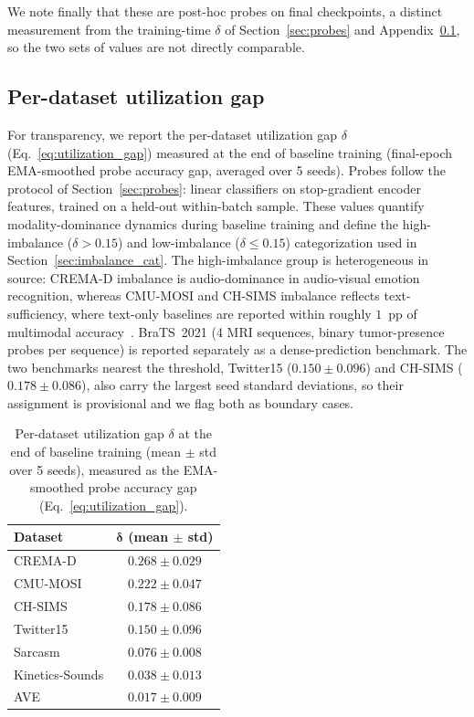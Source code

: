 \documentclass{article}
\begin{document}
We note finally that these are post-hoc probes on final checkpoints, a distinct measurement from the training-time $\delta$ of Section~\ref{sec:probes} and Appendix~\ref{app:delta}, so the two sets of values are not directly comparable.

\subsection{Per-dataset utilization gap}
\label{app:delta}

For transparency, we report the per-dataset utilization gap $\delta$ (Eq.~\eqref{eq:utilization_gap}) measured at the end of baseline training (final-epoch EMA-smoothed probe accuracy gap, averaged over 5 seeds). Probes follow the protocol of Section~\ref{sec:probes}: linear classifiers on stop-gradient encoder features, trained on a held-out within-batch sample. These values quantify modality-dominance dynamics during baseline training and define the high-imbalance ($\delta > 0.15$) and low-imbalance ($\delta \leq 0.15$) categorization used in Section~\ref{sec:imbalance_cat}. The high-imbalance group is heterogeneous in source: CREMA-D imbalance is audio-dominance in audio-visual emotion recognition, whereas CMU-MOSI and CH-SIMS imbalance reflects text-sufficiency, where text-only baselines are reported within roughly $1$~pp of multimodal accuracy~\citep{li2023agm,liu2022chsimsv2,wei2025dgl}. BraTS~2021 (4 MRI sequences, binary tumor-presence probes per sequence) is reported separately as a dense-prediction benchmark. The two benchmarks nearest the threshold, Twitter15 ($0.150 \pm 0.096$) and CH-SIMS ($0.178 \pm 0.086$), also carry the largest seed standard deviations, so their assignment is provisional and we flag both as boundary cases.

\begin{table}[H]
\centering
\caption{Per-dataset utilization gap $\delta$ at the end of baseline training (mean $\pm$ std over 5 seeds), measured as the EMA-smoothed probe accuracy gap (Eq.~\eqref{eq:utilization_gap}).}
\label{tab:delta_per_dataset}
\vspace{0.3em}
\begin{tabular}{lc}
\toprule
\textbf{Dataset} & $\boldsymbol{\delta}$ \textbf{(mean $\pm$ std)} \\
\midrule
CREMA-D       & $0.268 \pm 0.029$ \\
CMU-MOSI      & $0.222 \pm 0.047$ \\
CH-SIMS     & $0.178 \pm 0.086$ \\
Twitter15     & $0.150 \pm 0.096$ \\
Sarcasm       & $0.076 \pm 0.008$ \\
Kinetics-Sounds & $0.038 \pm 0.013$ \\
AVE           & $0.017 \pm 0.009$ \\
\bottomrule
\end{tabular}
\end{table}
\end{document}

